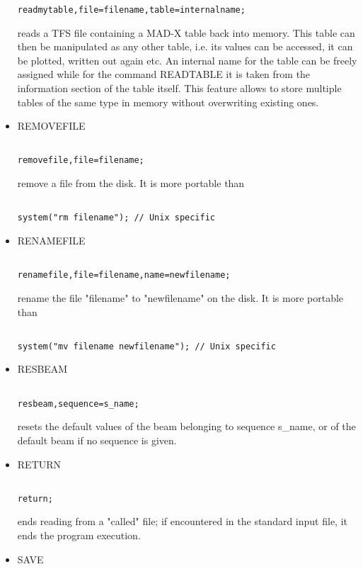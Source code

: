 \begin{itemize}
\begin{verbatim}
readmytable,file=filename,table=internalname;
\end{verbatim} reads a TFS file containing a MAD-X table back into memory. This table can then be manipulated as any other table, i.e. its values can be accessed, it can be plotted, written out again etc. An internal name for the table can be freely assigned while for the command READTABLE it is taken from the information section of the table itself. This feature allows to store multiple tables of the same type in memory without overwriting existing ones. 


	\item REMOVEFILE
\begin{verbatim}

removefile,file=filename;
\end{verbatim} remove a file from the disk. It is more portable than 
\begin{verbatim}

system("rm filename"); // Unix specific
\end{verbatim}


	\item RENAMEFILE
\begin{verbatim}

renamefile,file=filename,name=newfilename;
\end{verbatim} rename the file "filename" to "newfilename" on the disk. It is more portable than 
\begin{verbatim}

system("mv filename newfilename"); // Unix specific
\end{verbatim}


	\item RESBEAM
\begin{verbatim}

resbeam,sequence=s_name;
\end{verbatim} resets the default values of the beam belonging to sequence s\_name, or of the default beam if no sequence is given. 


	\item RETURN
\begin{verbatim}

return;
\end{verbatim} ends reading from a "called" file; if encountered in the standard input file, it ends the program execution. 


	\item SAVE
\begin{verbatim}


\end{verbatim}
\end{itemize}
